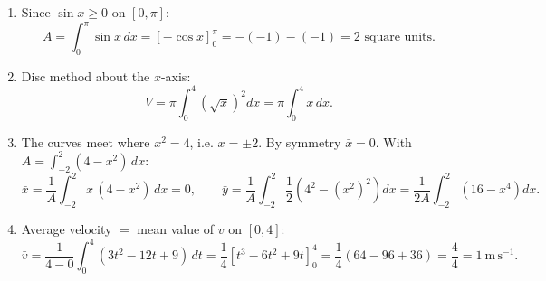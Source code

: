 \documentclass[11pt]{article}
\begin{document}
\begin{corrige}
\begin{enumerate}
\item Since $\sin x \ge 0$ on $[0,\pi]$:
\[
A = \int_0^\pi \sin x\,dx = \left[-\cos x\right]_0^\pi = -(-1) - (-1) = 2 \text{ square units}.
\]

\item Disc method about the $x$-axis:
\[
V = \pi \int_0^4 \left(\sqrt{x}\right)^2 dx = \pi\int_0^4 x\,dx.
\]

\item The curves meet where $x^2 = 4$, i.e. $x = \pm 2$. By symmetry $\bar{x} = 0$. With $A = \displaystyle\int_{-2}^{2}(4 - x^2)\,dx$:
\[
\bar{x} = \frac{1}{A}\int_{-2}^{2} x\,(4 - x^2)\,dx = 0, \qquad
\bar{y} = \frac{1}{A}\int_{-2}^{2} \frac{1}{2}\left(4^2 - (x^2)^2\right)dx = \frac{1}{2A}\int_{-2}^{2}\left(16 - x^4\right)dx.
\]

\item Average velocity $=$ mean value of $v$ on $[0,4]$:
\[
\bar{v} = \frac{1}{4-0}\int_0^4 (3t^2 - 12t + 9)\,dt = \frac{1}{4}\left[t^3 - 6t^2 + 9t\right]_0^4 = \frac{1}{4}(64 - 96 + 36) = \frac{4}{4} = 1\ \mathrm{m\,s^{-1}}.
\]
\end{enumerate}
\end{corrige}
\end{document}
